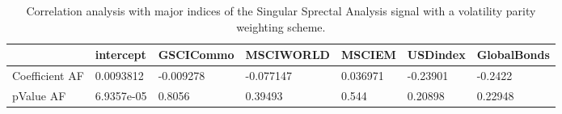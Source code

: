 \begin{table}[H]
\centering
\begin{tabular}{lllllll}
& intercept & GSCICommo & MSCIWORLD & MSCIEM & USDindex & GlobalBonds \\ 
\hline 
Coefficient AF & 0.0093812 & -0.009278 & -0.077147 & 0.036971 & -0.23901 & -0.2422 \\ 
pValue AF & 6.9357e-05 & 0.8056 & 0.39493 & 0.544 & 0.20898 & 0.22948 \\ 
\hline
\end{tabular}
\caption{Correlation analysis with major indices of the Singular Sprectal Analysis signal with a volatility parity weighting scheme.}
\label{SSA_Quantity_AFACTOR}
\end{table}